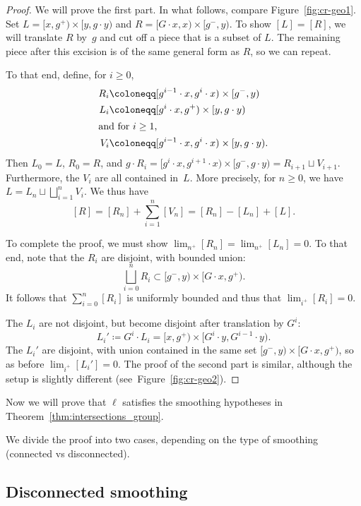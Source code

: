 \documentclass[11pt]{amsart}
\numberwithin{equation}{section}
\numberwithin{figure}{section}
\theoremstyle{definition}
\theoremstyle{plain}
\begin{document}
\begin{proof}
  We will prove the first part.
  In what follows, compare Figure~\ref{fig:cr-geo1}.
  Set $L = [x,g^+)\times[y,g \cdot y)$ and
  $R = [G \cdot x,x)\times[g^-,y)$. To show $[L] = [R]$, we will
  translate $R$ by~$g$ and cut off a piece that is a subset of $L$.
  The remaining piece after this excision is of the same general form
  as $R$, so we can repeat.

  To that end, define, for $i \ge 0$,
  \begin{align*}
    R_i &\coloneqq [g^{i-1}\cdot x, g^i \cdot x) \times [g^-, y)\\
    L_i &\coloneqq [g^i \cdot x,g^+) \times [y, g \cdot y)\\
    \intertext{and for $i \ge 1$,}
    V_i &\coloneqq [g^{i-1} \cdot x, g^i \cdot x) \times [y, g \cdot y).
  \end{align*}
  Then $L_0 = L$, $R_0 = R$, and
  $g \cdot R_i = [g^i \cdot x, g^{i+1} \cdot x) \times [g^-, g \cdot
  y) = R_{i+1} \sqcup V_{i+1}$.
  Furthermore, the $V_i$ are all contained in~$L$. More precisely, for
  $n\ge 0$, we have $L = L_n \sqcup \bigsqcup_{i=1}^n V_i$.
  We thus have
  \[
    [R] = [R_n] + \sum_{i=1}^n [V_n] = [R_n] - [L_n] + [L].
  \]

  To complete the proof, we must show
  $\lim_{n^+} [R_n] = \lim_{n^+}[L_n] = 0$. To that end, note that the
  $R_i$ are disjoint, with bounded union:
  \[
    \bigsqcup_{i=0}^n R_i \subset [g^-,y) \times [G \cdot x, g^+).
  \]
  It follows that $\sum_{i=0}^n [R_i]$ is uniformly bounded and thus
  that $\lim_{i^+} [R_i] = 0$.

  The $L_i$ are not disjoint, but become disjoint after translation by
  $G^i$:
  \[
    L_i' \coloneqq G^i \cdot L_i = [x, g^+) \times [G^i \cdot y, G^{i-1} \cdot y).
  \]
  The $L_i'$ are disjoint, with union contained in the same set
  $[g^-,y) \times [G \cdot x, g^+)$, so as before $\lim_{i^+} [L_i'] = 0$.
  The proof of the second part is similar, although the setup is slightly different (see~Figure~\ref{fig:cr-geo2}).
\end{proof}

Now we will prove that $\ell$ satisfies the smoothing hypotheses in Theorem~\ref{thm:intersections_group}.

We divide the proof into two cases, depending on the type of smoothing (connected vs disconnected).



\subsection{Disconnected smoothing}
\end{document}
